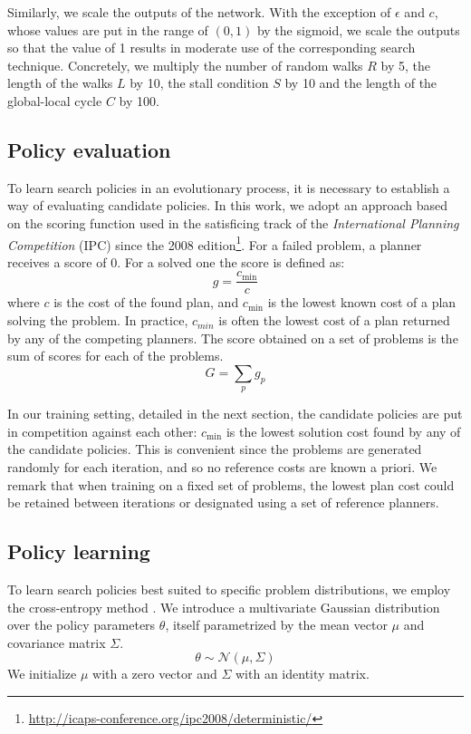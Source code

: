 \documentclass[letterpaper]{article} %
\begin{document}
Similarly, we scale the outputs of the network. With the exception of $\epsilon$ and $c$, whose values are put in the range of $(0,1)$ by the sigmoid, we scale the outputs so that the value of 1 results in moderate use of the corresponding search technique. Concretely, we multiply the number of random walks $R$ by 5, the length of the walks $L$ by 10, the stall condition $S$ by 10 and the length of the global-local cycle $C$ by 100.

\subsection{Policy evaluation}

To learn search policies in an evolutionary process, it is necessary to establish a way of evaluating candidate policies. In this work, we adopt an approach based on the scoring function used in the satisficing track of the \emph{International Planning Competition} (IPC) since the 2008 edition\footnote{\url{http://icaps-conference.org/ipc2008/deterministic/}}. For a failed problem, a planner receives a score of 0. For a solved one the score is defined as:
$$ g = \frac{c_{\textrm{min}}}{c}$$
where $c$ is the cost of the found plan, and $c_\textrm{min}$ is the lowest known cost of a plan solving the problem. In practice, $c_{min}$ is often the lowest cost of a plan returned by any of the competing planners. The score obtained on a set of problems is the sum of scores for each of the problems.
$$ G = \displaystyle{\sum_p}g_p$$

 In our training setting, detailed in the next section, the candidate policies are put in competition against each other: $c_{\mathrm{min}}$ is the lowest solution cost found by any of the candidate policies. This is convenient since the problems are generated randomly for each iteration, and so no reference costs are known a priori. We remark that when training on a fixed set of problems, the lowest plan cost could be retained between iterations or designated using a set of reference planners.

\subsection{Policy learning}

To learn search policies best suited to specific problem distributions, we employ the cross-entropy method \cite{Rubinstein1999,Mannor2003}. We introduce a multivariate Gaussian distribution over the policy parameters $\theta$, itself parametrized by the mean vector $\mu$ and covariance matrix $\Sigma$.
$$\theta \sim \mathcal{N}(\mu, \Sigma)$$
We initialize $\mu$ with a zero vector and $\Sigma$ with an identity matrix.
\end{document}
